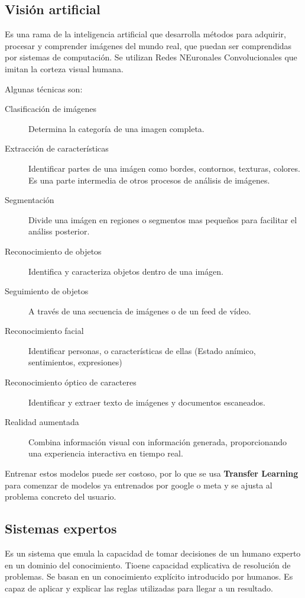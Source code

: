 \subsection{Visión artificial}
    Es una rama de la inteligencia artificial que desarrolla métodos para adquirir, procesar y comprender imágenes del mundo real, que puedan ser comprendidas por sistemas de computación. Se utilizan Redes NEuronales Convolucionales que imitan la corteza visual humana.

    Algunas técnicas son:
    \begin{description}
        \item[Clasificación de imágenes] Determina la categoría de una imagen completa.
        \item[Extracción de características] Identificar partes de una imágen como bordes, contornos, texturas, colores. Es una parte intermedia de otros procesos de análisis de imágenes.
        \item[Segmentación] Divide una imágen en regiones o segmentos mas pequeños para facilitar el análiss posterior.
        \item[Reconocimiento de objetos] Identifica y caracteriza objetos dentro de una imágen.
        \item[Seguimiento de objetos] A través de una secuencia de imágenes o de un feed de vídeo.
        \item[Reconocimiento facial] Identificar personas, o características de ellas (Estado anímico, sentimientos, expresiones)
        \item[Reconocimiento óptico de caracteres] Identificar y extraer texto de imágenes y documentos escaneados.
        \item[Realidad aumentada] Combina información visual con información generada, proporcionando una experiencia interactiva en tiempo real.
    \end{description}

    Entrenar estos modelos puede ser costoso, por lo que se usa \textbf{Transfer Learning} para comenzar de modelos ya entrenados por google o meta y se ajusta al problema concreto del usuario.

\subsection{Sistemas expertos}
    Es un sistema que emula la capacidad de tomar decisiones de un humano experto en un dominio del conocimiento. Tioene capacidad explicativa de resolución de problemas. Se basan en un conocimiento explícito introducido por humanos. Es capaz de aplicar y explicar las reglas utilizadas para llegar a un resultado.

